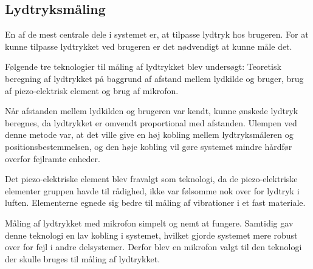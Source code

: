 \subsection{Lydtryksmåling}

En af de mest centrale dele i systemet er, at tilpasse lydtryk hos brugeren. For at kunne tilpasse lydtrykket ved brugeren er det nødvendigt at kunne måle det. 

Følgende tre teknologier til måling af lydtrykket blev undersøgt: Teoretisk beregning af lydtrykket på baggrund af afstand mellem lydkilde og bruger, brug af piezo-elektrisk element og brug af mikrofon. 

Når afstanden mellem lydkilden og brugeren var kendt, kunne ønskede lydtryk beregnes, da lydtrykket er omvendt proportional med afstanden. Ulempen ved denne metode var, at det ville give en høj kobling mellem lydtryksmåleren og positionsbestemmelsen, og den høje kobling vil gøre systemet mindre hårdfør overfor fejlramte enheder.

Det piezo-elektriske element blev fravalgt som teknologi, da de piezo-elektriske elementer gruppen havde til rådighed, ikke var følsomme nok over for lydtryk i luften.  Elementerne egnede sig bedre til måling af vibrationer i et fast materiale.

Måling af lydtrykket med mikrofon simpelt og nemt at fungere. Samtidig gav denne teknologi en lav kobling i systemet, hvilket gjorde systemet mere robust over for fejl i andre delsystemer. Derfor blev en mikrofon valgt til den teknologi der skulle bruges til måling af lydtrykket.    